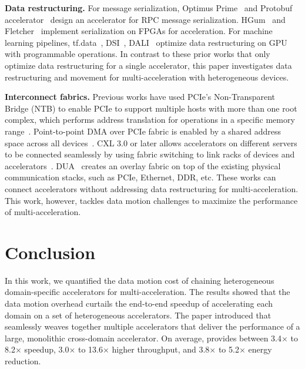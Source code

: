 \noindent \textbf{Data restructuring.}
%
For message serialization, Optimus Prime~\cite{optimusprime:asplos:2020} and Protobuf accelerator~\cite{protobuf:isca:2021} design an accelerator for RPC message serialization.
%
HGum~\cite{hgum:reconfig:2017} and Fletcher~\cite{peltenburg-2019-fletcher} implement serialization on FPGAs for acceleration.
%
For machine learning pipelines, tf.data~\cite{tf.data:pvldb:2021}, DSI~\cite{dsi-dlrm:isca:2022}, DALI~\cite{nvidia-dali:2018} optimize data restructuring on GPU with programmable operations.
%
In contrast to these prior works that only optimize data restructuring for a single accelerator, this paper investigates data restructuring and movement for multi-acceleration with heterogeneous devices.
%

\noindent \textbf{Interconnect fabrics.}
%
Previous works have used PCIe's Non-Transparent Bridge (NTB) to enable PCIe to support multiple hosts with more than one root complex, which performs address translation for operations in a specific memory range~\cite{hou:hpca:2013,smartio:tocs:2021}.
%
Point-to-point DMA over PCIe fabric is enabled by a shared address space across all devices~\cite{gigaio-pcie-swtich}.
%
CXL 3.0 or later allows accelerators on different servers to be connected seamlessly by using fabric switching to link racks of devices and accelerators~\cite{cxl-3-0-spec}.    
%
DUA~\cite{dua:nsdi:2019} creates an overlay fabric on top of the existing physical communication stacks, such as PCIe, Ethernet, DDR, etc.
%
These works can connect accelerators without addressing data restructuring for multi-acceleration.
%
This work, however, tackles data motion challenges to maximize the performance of multi-acceleration.

\section{Conclusion}
\label{sec:conclusion}
%
In this work, we quantified the data motion cost of chaining heterogeneous domain-specific accelerators for multi-acceleration.
%
The results showed that the data motion overhead curtails the end-to-end speedup of accelerating each domain on a set of heterogeneous accelerators. 
%
The paper introduced \dmx that seamlessly weaves together multiple accelerators that deliver the performance of a large, monolithic cross-domain accelerator. 
%
On average, \dmx provides between 3.4$\times$ to 8.2$\times$ speedup, 3.0$\times$ to 13.6$\times$ higher throughput, and 3.8$\times$ to 5.2$\times$ energy reduction.

